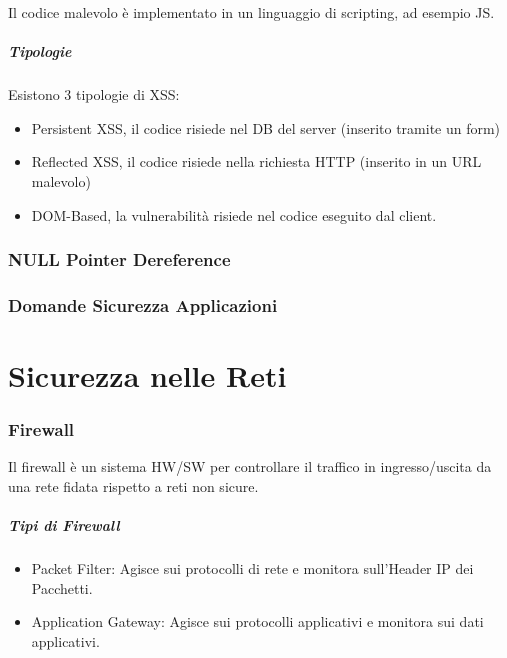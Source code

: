 \documentclass[12pt, a4paper, openany]{book}
\begin{document}
Il codice malevolo è implementato in un linguaggio di scripting, ad esempio JS.

\paragraph{Tipologie}
Esistono 3 tipologie di XSS:
\begin{itemize}
    \item Persistent XSS, il codice risiede nel DB del server (inserito tramite un form)
    \item Reflected XSS, il codice risiede nella richiesta HTTP (inserito in un URL malevolo)
    \item DOM-Based, la vulnerabilità risiede nel codice eseguito dal client.
\end{itemize}

\subsection{NULL Pointer Dereference} %


\subsection{Domande Sicurezza Applicazioni}


\chapter{Sicurezza nelle Reti}
\subsection{Firewall}
Il firewall è un sistema HW/SW per controllare il traffico in ingresso/uscita da una rete fidata rispetto a reti non sicure.

\paragraph*{Tipi di Firewall}
\begin{itemize}
    \item Packet Filter: Agisce sui protocolli di rete e monitora sull'Header IP dei Pacchetti.
    \item Application Gateway: Agisce sui protocolli applicativi e monitora sui dati applicativi.
\end{itemize}
\end{document}
